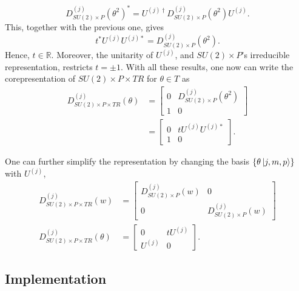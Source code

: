 \documentclass[preprint, 12pt]{revtex4-2}
\numberwithin{equation}{section}
\begin{document}
\begin{equation}
    D^{(j)}_{SU(2)\times P}(\theta^{2})^\ast = U^{(j)\dagger}D^{(j)}_{SU(2)\times P}(\theta^{2})U^{(j)}.
\end{equation}
This, together with the previous one, gives
\begin{equation}
    t^\ast U^{(j)}U^{(j)\ast} = D^{(j)}_{SU(2)\times P}(\theta^{2}).
\end{equation}
Hence, $t\in\mathbb{R}$. Moreover, the unitarity of $U^{(j)}$, and $SU(2)\times P$'s irreducible representation, restricts $t = \pm 1$. With all these results, one now can write the corepresentation of $SU(2)\times P\times TR$ for $\theta\in T$ as
\begin{equation}
    \begin{aligned}
        D_{SU(2)\times P\times TR}^{(j)}(\theta) &= 
        \begin{bmatrix}
            0 & D^{(j)}_{SU(2)\times P}(\theta^2) \\
            1 & 0
        \end{bmatrix} \\
        &= \begin{bmatrix}
            0 & t U^{(j)}U^{(j)\ast} \\
            1 & 0
        \end{bmatrix}.
    \end{aligned}
\end{equation}

One can further simplify the representation by changing the basis $\{\theta\ket{j, m, p}\}$ with $U^{(j)}$,
\begin{equation}
    \begin{aligned}
        D_{SU(2)\times P\times TR}^{(j)}(w) &= 
        \begin{bmatrix}
            D^{(j)}_{SU(2)\times P}(w) & 0 \\
            0 & D^{(j)}_{SU(2)\times P}(w)
        \end{bmatrix} \\
        D_{SU(2)\times P\times TR}^{(j)}(\theta) &= 
        \begin{bmatrix}
            0 & t U^{(j)} \\
            U^{(j)} & 0
        \end{bmatrix}.
    \end{aligned}
\end{equation}

\subsection{Implementation}
\end{document}
